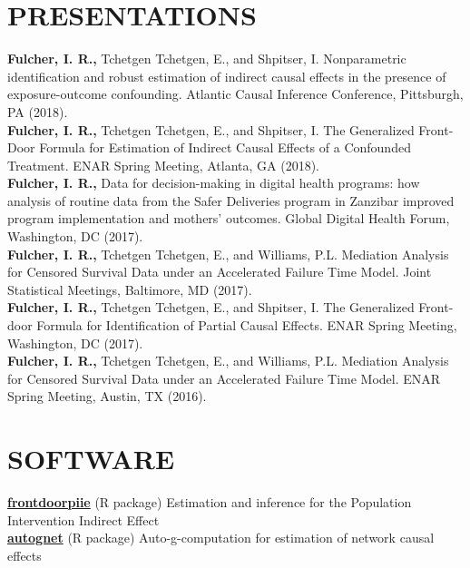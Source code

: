 \documentclass[12pt]{article}
\begin{document}
\section*{\textbf{{\large P}{RESENTATIONS}}}

\textbf{Fulcher, I. R.,} Tchetgen Tchetgen, E., and Shpitser, I. Nonparametric identification and robust estimation of indirect causal effects in the presence of exposure-outcome confounding. Atlantic Causal Inference Conference, Pittsburgh, PA (2018). \\

\textbf{Fulcher, I. R.,} Tchetgen Tchetgen, E., and Shpitser, I. The Generalized Front-Door Formula for Estimation of Indirect Causal Effects of a Confounded Treatment. ENAR Spring Meeting, Atlanta, GA (2018). \\

\textbf{Fulcher, I. R.,} Data for decision-making in digital health programs: how analysis of routine data from the Safer Deliveries program in Zanzibar improved program implementation and mothers' outcomes. Global Digital Health Forum, Washington, DC (2017). \\

\textbf{Fulcher, I. R.,} Tchetgen Tchetgen, E., and Williams, P.L. Mediation Analysis for Censored Survival Data under an Accelerated Failure Time Model. Joint Statistical Meetings, Baltimore, MD (2017). \\

\textbf{Fulcher, I. R.,} Tchetgen Tchetgen, E., and Shpitser, I. The Generalized Front-door Formula for Identification of Partial Causal Effects. ENAR Spring Meeting, Washington, DC (2017). \\

\textbf{Fulcher, I. R.,} Tchetgen Tchetgen, E., and Williams, P.L. Mediation Analysis for Censored Survival Data under an Accelerated Failure Time Model. ENAR Spring Meeting, Austin, TX (2016). 

\section*{\textbf{{\large S}{OFTWARE}}}

{\bf \href{https://isabelfulcher.github.io/frontdoorpiie/}{frontdoorpiie}} (R package) Estimation and inference for the Population Intervention Indirect Effect \\

{\bf \href{https://isabelfulcher.github.io/autognet/}{autognet}} (R package) Auto-g-computation for estimation of network causal effects
\end{document}
